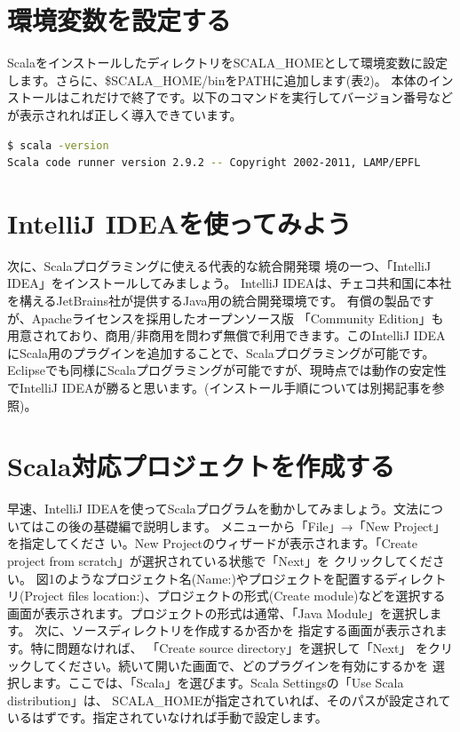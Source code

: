 \documentclass[10pt]{jarticle}
\begin{document}
\section{環境変数を設定する}
ScalaをインストールしたディレクトリをSCALA\_HOMEとして環境変数に設定します。さらに、\$SCALA\_HOME/binをPATHに追加します(表2)。 本体のインストールはこれだけで終了です。以下のコマンドを実行してバージョン番号などが表示されれば正しく導入できています。

\begin{lstlisting}[language=bash, frame=none]
$ scala -version
Scala code runner version 2.9.2 -- Copyright 2002-2011, LAMP/EPFL
\end{lstlisting}

\section{IntelliJ IDEAを使ってみよう}
次に、Scalaプログラミングに使える代表的な統合開発環 境の一つ、「IntelliJ IDEA」をインストールしてみましょう。 IntelliJ IDEAは、チェコ共和国に本社を構えるJetBrains社が提供するJava用の統合開発環境です。 有償の製品ですが、Apacheライセンスを採用したオープンソース版 「Community Edition」も用意されており、商用/非商用を問わず無償で利用できます。このIntelliJ IDEAにScala用のプラグインを追加することで、Scalaプログラミングが可能です。Eclipseでも同様にScalaプログラミングが可能ですが、現時点では動作の安定性でIntelliJ IDEAが勝ると思います。(インストール手順については別掲記事を参照)。

\section{Scala対応プロジェクトを作成する}
早速、IntelliJ IDEAを使ってScalaプログラムを動かしてみましょう。文法についてはこの後の基礎編で説明します。 メニューから「File」→「New Project」を指定してくださ い。New Projectのウィザードが表示されます。「Create project from scratch」が選択されている状態で「Next」を クリックしてください。 図1のようなプロジェクト名(Name:)やプロジェクトを配置するディレクトリ(Project files location:)、プロジェクトの形式(Create module)などを選択する画面が表示されます。プロジェクトの形式は通常、「Java Module」を選択します。 次に、ソースディレクトリを作成するか否かを 指定する画面が表示されます。特に問題なければ、 「Create source directory」を選択して「Next」 をクリックしてください。続いて開いた画面で、どのプラグインを有効にするかを 選択します。ここでは、「Scala」を選びます。Scala Settingsの「Use Scala distribution」は、 SCALA\_HOMEが指定されていれば、そのパスが設定されているはずです。指定されていなければ手動で設定します。
\end{document}
